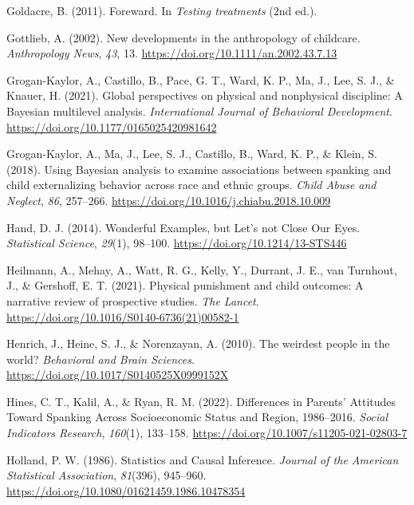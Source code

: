 \documentclass[
  letterpaper,
  DIV=11,
  numbers=noendperiod]{scrreprt}
\newlength{\cslhangindent}
\newenvironment{CSLReferences}[2] %
 {\begin{list}{}{%
  \setlength{\itemindent}{0pt}
  \setlength{\leftmargin}{0pt}
  \setlength{\parsep}{0pt}
  \ifodd #1
   \setlength{\leftmargin}{\cslhangindent}
   \setlength{\itemindent}{-1\cslhangindent}
  \fi
  \setlength{\itemsep}{#2\baselineskip}}}
 {\end{list}}
\begin{document}
\begin{CSLReferences}{1}{0}
Goldacre, B. (2011). {Foreward}. In \emph{Testing treatments} (2nd ed.).

Gottlieb, A. (2002). New developments in the anthropology of childcare.
\emph{Anthropology News}, \emph{43}, 13.
\url{https://doi.org/10.1111/an.2002.43.7.13}

Grogan-Kaylor, A., Castillo, B., Pace, G. T., Ward, K. P., Ma, J., Lee,
S. J., \& Knauer, H. (2021). {Global perspectives on physical and
nonphysical discipline: A {B}ayesian multilevel analysis}.
\emph{International Journal of Behavioral Development}.
\url{https://doi.org/10.1177/0165025420981642}

Grogan-Kaylor, A., Ma, J., Lee, S. J., Castillo, B., Ward, K. P., \&
Klein, S. (2018). Using {B}ayesian analysis to examine associations
between spanking and child externalizing behavior across race and ethnic
groups. \emph{Child Abuse and Neglect}, \emph{86}, 257--266.
\url{https://doi.org/10.1016/j.chiabu.2018.10.009}

Hand, D. J. (2014). {Wonderful Examples, but Let's not Close Our Eyes}.
\emph{Statistical Science}, \emph{29}(1), 98--100.
\url{https://doi.org/10.1214/13-STS446}

Heilmann, A., Mehay, A., Watt, R. G., Kelly, Y., Durrant, J. E., van
Turnhout, J., \& Gershoff, E. T. (2021). Physical punishment and child
outcomes: A narrative review of prospective studies. \emph{The Lancet}.
\url{https://doi.org/10.1016/S0140-6736(21)00582-1}

Henrich, J., Heine, S. J., \& Norenzayan, A. (2010). {The weirdest
people in the world?} \emph{Behavioral and Brain Sciences}.
\url{https://doi.org/10.1017/S0140525X0999152X}

Hines, C. T., Kalil, A., \& Ryan, R. M. (2022). {Differences in Parents'
Attitudes Toward Spanking Across Socioeconomic Status and Region,
1986--2016}. \emph{Social Indicators Research}, \emph{160}(1), 133--158.
\url{https://doi.org/10.1007/s11205-021-02803-7}

Holland, P. W. (1986). {Statistics and Causal Inference}. \emph{Journal
of the American Statistical Association}, \emph{81}(396), 945--960.
\url{https://doi.org/10.1080/01621459.1986.10478354}


\end{CSLReferences}
\end{document}
